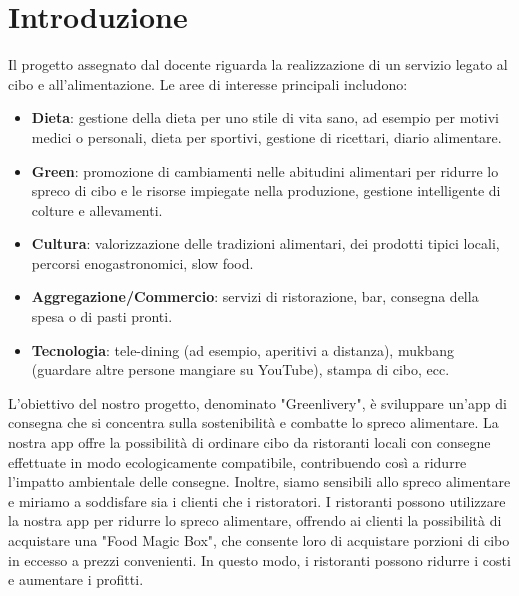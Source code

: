 \documentclass{article}
\begin{document}
\section{Introduzione}\par
Il progetto assegnato dal docente riguarda la realizzazione di un servizio legato al cibo e all'alimentazione. Le aree di interesse principali includono: \par
\begin{itemize}
    \item \textbf{Dieta}: gestione della dieta per uno stile di vita sano, ad esempio per motivi medici o personali, dieta per sportivi, gestione di ricettari, diario alimentare.\par
    \item \textbf{Green}: promozione di cambiamenti nelle abitudini alimentari per ridurre lo spreco di cibo e le risorse impiegate nella produzione, gestione intelligente di colture e allevamenti.\par
    \item \textbf{Cultura}: valorizzazione delle tradizioni alimentari, dei prodotti tipici locali, percorsi enogastronomici, slow food.\par
    \item \textbf{Aggregazione/Commercio}: servizi di ristorazione, bar, consegna della spesa o di pasti pronti.\par
    \item \textbf{Tecnologia}:  tele-dining (ad esempio, aperitivi a distanza), mukbang (guardare altre persone mangiare su YouTube), stampa di cibo, ecc. \par
\end{itemize}
\vspace{1cm}



     \par
    \vspace{0.5cm}
    L'obiettivo del nostro progetto, denominato "Greenlivery", è sviluppare un'app di consegna che si concentra sulla sostenibilità e combatte lo spreco alimentare. La nostra app offre la possibilità di ordinare cibo da ristoranti locali con consegne effettuate in modo ecologicamente compatibile, contribuendo così a ridurre l'impatto ambientale delle consegne. Inoltre, siamo sensibili allo spreco alimentare e miriamo a soddisfare sia i clienti che i ristoratori. I ristoranti possono utilizzare la nostra app per ridurre lo spreco alimentare, offrendo ai clienti la possibilità di acquistare una "Food Magic Box", che consente loro di acquistare porzioni di cibo in eccesso a prezzi convenienti. In questo modo, i ristoranti possono ridurre i costi e aumentare i profitti. 
    \vspace{1cm}
    
\end{document}
